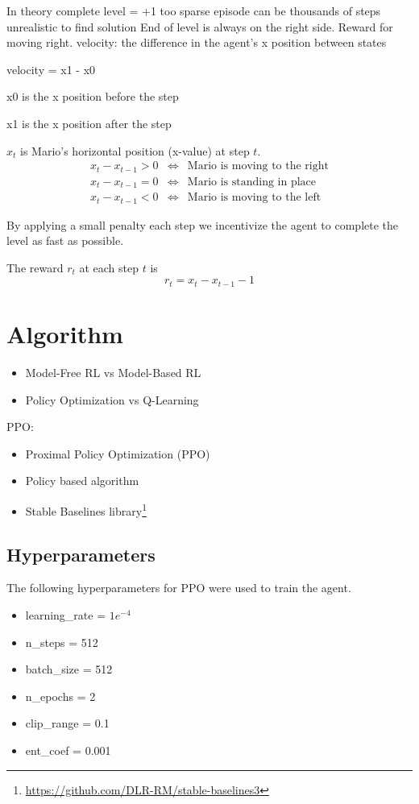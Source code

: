 \documentclass{article}
\begin{document}
In theory complete level = +1
too sparse
episode can be thousands of steps
unrealistic to find solution
End of level is always on the right side. Reward for moving right.
velocity: the difference in the agent's x position between states

velocity = x1 - x0

x0 is the x position before the step

x1 is the x position after the step

$x_{t}$ is Mario's horizontal position (x-value) at step $t$.
\begin{eqnarray*}
    x_{t} - x_{t-1} > 0&\iff&\text{Mario is moving to the right}\\
    x_{t} - x_{t-1} = 0&\iff&\text{Mario is standing in place}\\
    x_{t} - x_{t-1} < 0&\iff&\text{Mario is moving to the left}
\end{eqnarray*}

By applying a small penalty each step we incentivize the agent to complete the level as fast as possible.

The reward $r_{t}$ at each step $t$ is
\[r_{t} = x_{t} - x_{t-1} - 1\]


\section{Algorithm}
\begin{itemize}
    \item Model-Free RL vs Model-Based RL
    \item Policy Optimization vs Q-Learning
\end{itemize}
PPO:
\begin{itemize}
    \item Proximal Policy Optimization (PPO)\cite{schulman2017proximal}
    \item Policy based algorithm
    \item Stable Baselines library\footnote{\url{https://github.com/DLR-RM/stable-baselines3}}
\end{itemize}
\subsection{Hyperparameters}
The following hyperparameters for PPO were used to train the agent.
\begin{itemize}
    \item learning\_rate = $1e^{-4}$
    \item n\_steps = 512
    \item batch\_size = 512
    \item n\_epochs = 2
    \item clip\_range = 0.1
    \item ent\_coef = 0.001
\end{itemize}
\end{document}
